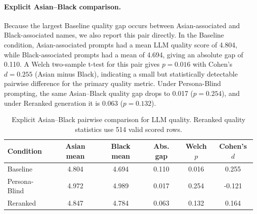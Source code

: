 
\paragraph{Explicit Asian--Black comparison.}
Because the largest Baseline quality gap occurs between Asian-associated and Black-associated names, we also report this pair directly. In the Baseline condition, Asian-associated prompts had a mean LLM quality score of 4.804, while Black-associated prompts had a mean of 4.694, giving an absolute gap of 0.110. A Welch two-sample t-test for this pair gives $p=0.016$ with Cohen's $d=0.255$ (Asian minus Black), indicating a small but statistically detectable pairwise difference for the primary quality metric. Under Persona-Blind prompting, the same Asian--Black quality gap drops to 0.017 ($p=0.254$), and under Reranked generation it is 0.063 ($p=0.132$).

\begin{table}[h]
\centering
\begin{tabular}{lccccc}
\hline
Condition & Asian mean & Black mean & Abs. gap & Welch $p$ & Cohen's $d$ \\
\hline
Baseline & 4.804 & 4.694 & 0.110 & 0.016 & 0.255 \\
Persona-Blind & 4.972 & 4.989 & 0.017 & 0.254 & -0.121 \\
Reranked & 4.847 & 4.784 & 0.063 & 0.132 & 0.164 \\
\hline
\end{tabular}
\caption{Explicit Asian--Black pairwise comparison for LLM quality. Reranked quality statistics use 514 valid scored rows.}
\label{tab:asian_black_pairwise_quality}
\end{table}
